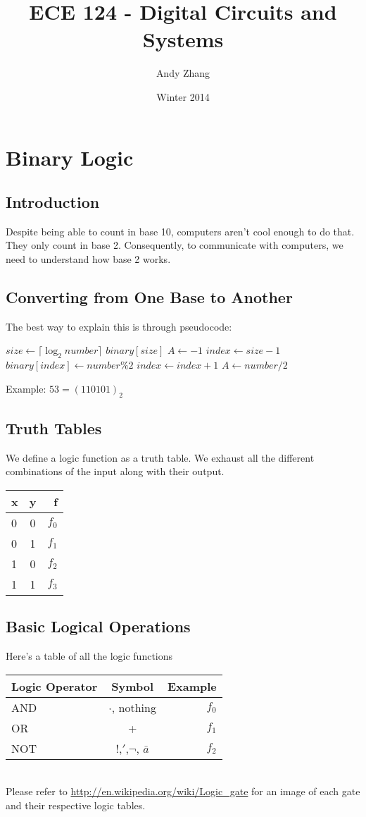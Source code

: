 \documentclass[12pt]{report}
\title{ECE 124 - Digital Circuits and Systems}
\author{Andy Zhang}
\date{Winter 2014}
\begin{document}
\maketitle
\tableofcontents

\chapter{Binary Logic}
	\section{Introduction}
			Despite being able to count in base 10, computers aren't cool enough to do that. They only count in base 2. Consequently, to communicate with computers, we need to understand how base 2 works.
	\section{Converting from One Base to Another}
		The best way to explain this is through pseudocode:
			\begin{algorithmic}
				\STATE $size \gets \lceil \log_2 number \rceil$
				\STATE $binary[size]$
				\STATE $A \gets -1$
				\STATE $index \gets size-1$
					\STATE $binary[index] \gets number \% 2$
					\STATE $index \gets index + 1$ 
					\STATE $A \gets number / 2$
				\ENDWHILE
			\end{algorithmic}
		Example: $53 = (110101)_2$
	\section{Truth Tables}
		We define a logic function as a truth table. We exhaust all the different combinations of the input along with their output.\\
		\begin{tabular}{ l | c || r }
			x & y & f \\
			\hline
			0 & 0 & $f_0$ \\
			0 & 1 & $f_1$ \\
			1 & 0 & $f_2$ \\
			1 & 1 & $f_3$ \\
		\end{tabular}
	\section{Basic Logical Operations}
		Here's a table of all the logic functions\\
		\begin{tabular}{ l | c || r }
			\hline
			Logic Operator & Symbol & Example \\
			\hline
			AND & $\cdot$, nothing 			& $f_0$ \\
			OR 	& + 						& $f_1$ \\
			NOT & !,$'$,$\neg$, $\bar{a}$	& $f_2$ \\
		\end{tabular}
		\\
		Please refer to \url{http://en.wikipedia.org/wiki/Logic_gate} for an image of each gate and their respective logic tables.
\end{document}
